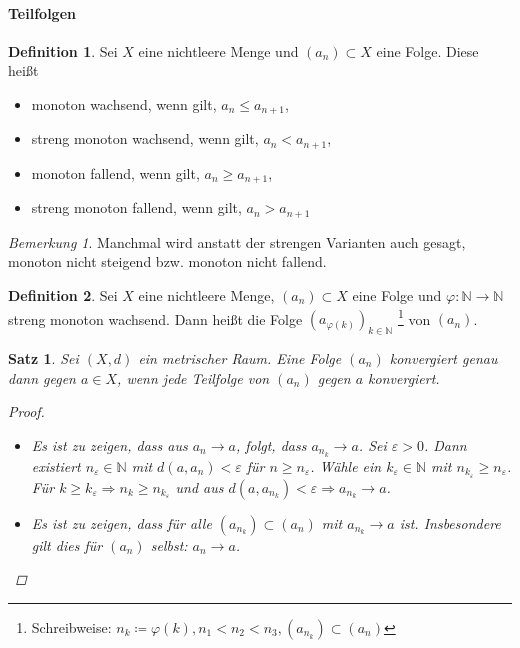 \documentclass[ngerman,titlepage,twoside, parskip=half*]{scrreprt}
\newcommand*{\N}{\mathbb{N}}
\theoremstyle{plain}
\newtheorem{theorem}{Satz}[section]
\theoremstyle{definition}
\newtheorem{definition}{Definition}
\theoremstyle{remark}
\newtheorem*{remark}{Bemerkung}
\newcommand*{\highl}[2][]{\textbf{\boldmath{#2}}%
  \ifthenelse{\equal{#1}{}}{\index{#2}}{\index{#1}}%
}
\begin{document}
\paragraph{Teilfolgen}

\begin{definition}
  Sei $X$ eine nichtleere Menge und $(a_{n})\subset X$ eine Folge. Diese heißt
  \begin{itemize}
   \item monoton wachsend, wenn gilt, $a_{n}\leq a_{n+1}$,
   \item streng monoton wachsend, wenn gilt, $a_{n}<a_{n+1}$,
   \item monoton fallend, wenn gilt, $a_{n}\geq a_{n+1}$,
   \item streng monoton fallend, wenn gilt, $a_{n}>a_{n+1}$
  \end{itemize}
\end{definition}

\begin{remark}
  Manchmal wird anstatt der strengen Varianten auch gesagt, monoton nicht
  steigend bzw. monoton nicht fallend.
\end{remark}

\begin{definition}
  Sei $X$ eine nichtleere Menge, $(a_n) \subset X$ eine Folge und $\varphi
  \colon \N \rightarrow \N$ streng monoton wachsend. Dann heißt die Folge
  $(a_{\varphi(k)})_{k \in \N}$ \highl{Teilfolge}\footnote{Schreibweise: $n_k
  \coloneqq \varphi(k), n_1 < n_2 < n_3, (a_{n_k})\subset (a_n)$} von $(a_n)$.
\end{definition}

\begin{theorem}
  Sei $(X,d)$ ein metrischer Raum. Eine Folge $(a_n)$ konvergiert genau dann
  gegen $a \in X$, wenn jede Teilfolge von $(a_n)$ gegen $a$ konvergiert.
  \begin{proof}
\begin{itemize}
\item["`$\Rightarrow$"'] Es ist zu zeigen, dass aus $a_n \rightarrow a$,
  folgt, dass $a_{n_k} \rightarrow a$. 
  Sei $\varepsilon > 0$. Dann existiert $n_{\varepsilon} \in \N$ mit
  $d(a,a_n)<\varepsilon$ für $n \geq n_{\varepsilon}$. Wähle ein
  $k_{\varepsilon} \in \N$ mit $n_{k_{\varepsilon}}\geq n_{\varepsilon}$.
  Für $k \geq k_{\varepsilon} \Rightarrow n_k \geq n_{k_{\varepsilon}}$ und
  aus $d(a,a_{n_k})<\varepsilon \Rightarrow a_{n_k} \rightarrow a$.
\item["`$\Leftarrow$"'] Es ist zu zeigen, dass für alle $(a_{n_k}) \subset
  (a_n)$ mit $a_{n_k} \rightarrow a$ ist. Insbesondere gilt dies für $(a_n)$
  selbst: $a_n \rightarrow a$.
\end{itemize}
\end{proof}
\end{theorem}
\end{document}
